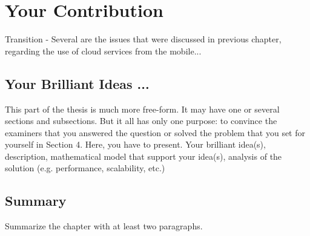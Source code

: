 
\chapter{Your Contribution} %

Transition - Several are the issues that were discussed in previous chapter, regarding the use of cloud services from the mobile...



\ifpdf
    \graphicspath{{X/figures/PNG/}{X/figures/PDF/}{X/figures/}}
\else
    \graphicspath{{X/figures/EPS/}{X/figures/}}
\fi


\section{Your Brilliant Ideas ...}
This part of the thesis is much more free-form. It may have one or several sections and subsections. But it all has only one purpose: to convince the examiners that you answered the question or solved the problem that you set for yourself in Section 4. Here, you have to present. Your brilliant idea(s), description, mathematical model that support your idea(s), analysis of the solution (e.g. performance,  scalability, etc.)




\section{Summary}
Summarize the chapter with at least two paragraphs.




